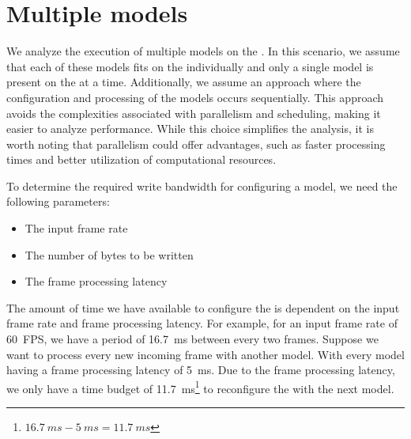 \section{Multiple models}
We analyze the execution of multiple models on the \graicore{}.
In this scenario, we assume that each of these models fits on the \graicore{} individually and only a single model is present on the \graicore{} at a time.
Additionally, we assume an approach where the configuration and processing of the models occurs sequentially.
This approach avoids the complexities associated with parallelism and scheduling, making it easier to analyze performance.
While this choice simplifies the analysis, it is worth noting that parallelism could offer advantages, such as faster processing times and better utilization of computational resources.

To determine the required write bandwidth for configuring a model, we need the following parameters:
\begin{itemize}
    \item The input frame rate
    \item The number of bytes to be written
    \item The frame processing latency
\end{itemize}

The amount of time we have available to configure the \graicore{} is dependent on the input frame rate and frame processing latency.
For example, for an input frame rate of \SI{60}{FPS}, we have a period of \SI{16.7}{ms} between every two frames.
Suppose we want to process every new incoming frame with another model.
With every model having a frame processing latency of \SI{5}{ms}. 
Due to the frame processing latency, we only have a time budget of \SI{11.7}{ms}\footnote{$\SI{16.7}{ms} - \SI{5}{ms} = \SI{11.7}{ms}$} to reconfigure the \graicore{} with the next model.

